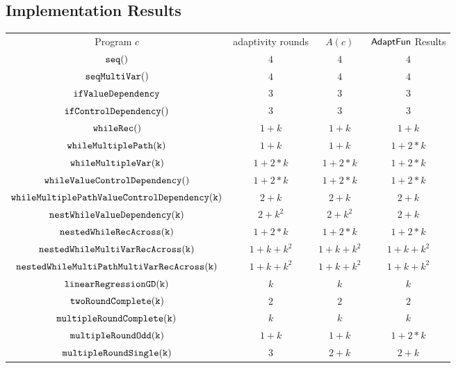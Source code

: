 \subsection{Implementation Results}  
    \begin{center}
        \begin{tabular}{ c c c c}
         Program $c$ & adaptivity rounds & $A(c)$ & $\textsf{AdaptFun}$ Results \\ 
         $\mathtt{seq()}$ & $4$ & $4$ & $4$ \\ 
         $\mathtt{seqMultiVar()}$ & $4$ & $4$ & $4$ \\  
         $ \mathtt{ifValueDependency}$ & $3$ & $3$ & $3$ \\
         $\mathtt{ifControlDependency()}$ & $3$ & $3$ & $3$  \\
         $ \mathtt{whileRec()}$ & $1+k$ & $1+k$ & $1+k$  \\
         $ \mathtt{whileMultiplePath(k)}$ & $1 + k$ & $1 + k$ & $1 + 2 * k$  \\
         $ \mathtt{whileMultipleVar(k)}$ & $1 + 2*k$ & $1 + 2*k$ & $1 + 2*k$  \\
         $ \mathtt{whileValueControlDependency()}$ & $1 + 2*k$ & $1 + 2*k$ & $1 + 2*k$  \\
         $ \mathtt{whileMultiplePathValueControlDependency(k)}$ & $2 + k$ & $2 + k$  & $2 + k$  \\
         $ \mathtt{nestWhileValueDependency(k)}$ & $2 + k^2$ & $2 + k^2$  & $2 + k$  \\
         $ \mathtt{nestedWhileRecAcross(k)}$ & $1 + 2*k$ & $1 + 2*k$ & $1 + 2*k$  \\
         $ \mathtt{nestedWhileMultiVarRecAcross(k)}$ & $1 + k + k^2$ & $1 + k + k^2$  & $1 + k + k^2$  \\
         $ \mathtt{nestedWhileMultiPathMultiVarRecAcross(k)}$ & $1 + k + k^2$ & $1 + k + k^2$  & $1 + k + k^2$  \\
         $ \mathtt{linearRegressionGD(k)}$ & $k$ & $k$ & $k$  \\
         $ \mathtt{twoRoundComplete(k)}$ & $2$ & $2$ & $2$ \\
         $ \mathtt{multipleRoundComplete(k)}$ & $k$ & $k$ & $k$  \\
         $ \mathtt{multipleRoundOdd(k)}$ & $1 + k$ & $1 + k$ & $1 + 2*k$  \\
         $ \mathtt{multipleRoundSingle(k)}$ & $3$ & $2 + k$ & $2 + k$  \\
        \end{tabular}
        \end{center}
